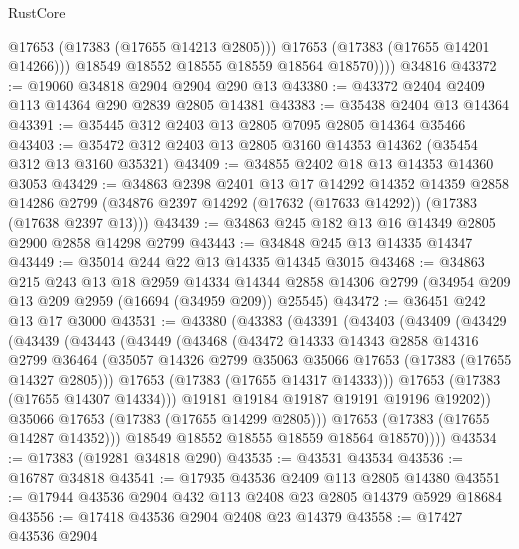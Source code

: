 \begin{lexlean}{RustCore}
\begin{coremodule}
                @17653
                (@17383 (@17655 @14213 @2805)))
              @17653
              (@17383 (@17655 @14201 @14266)))
            @18549
            @18552
            @18555
            @18559
            @18564
            @18570))))
    @34816
@43372 := @19060 @34818 @2904 @2904 @290 @13
@43380 := @43372 @2404 @2409 @113 @14364 @290 @2839 @2805 @14381
@43383 := @35438 @2404 @13 @14364
@43391 := @35445 @312 @2403 @13 @2805 @7095 @2805 @14364 @35466
@43403 := @35472 @312 @2403 @13 @2805 @3160 @14353 @14362 (@35454 @312 @13 @3160 @35321)
@43409 := @34855 @2402 @18 @13 @14353 @14360 @3053
@43429 := @34863
    @2398
    @2401
    @13
    @17
    @14292
    @14352
    @14359
    @2858
    @14286
    @2799
    (@34876 @2397 @14292 (@17632 (@17633 @14292)) (@17383 (@17638 @2397 @13)))
@43439 := @34863 @245 @182 @13 @16 @14349 @2805 @2900 @2858 @14298 @2799
@43443 := @34848 @245 @13 @14335 @14347
@43449 := @35014 @244 @22 @13 @14335 @14345 @3015
@43468 := @34863
    @215
    @243
    @13
    @18
    @2959
    @14334
    @14344
    @2858
    @14306
    @2799
    (@34954 @209 @13 @209 @2959 (@16694 (@34959 @209)) @25545)
@43472 := @36451 @242 @13 @17 @3000
@43531 := @43380
    (@43383
      (@43391
        (@43403
          (@43409
            (@43429
              (@43439
                (@43443
                  (@43449
                    (@43468
                      (@43472
                        @14333
                        @14343
                        @2858
                        @14316
                        @2799
                        @36464
                        (@35057 @14326 @2799 @35063 @35066 @17653 (@17383 (@17655 @14327 @2805)))
                        @17653
                        (@17383 (@17655 @14317 @14333)))
                      @17653
                      (@17383 (@17655 @14307 @14334)))
                    @19181
                    @19184
                    @19187
                    @19191
                    @19196
                    @19202))
                @35066
                @17653
                (@17383 (@17655 @14299 @2805)))
              @17653
              (@17383 (@17655 @14287 @14352)))
            @18549
            @18552
            @18555
            @18559
            @18564
            @18570))))
@43534 := @17383 (@19281 @34818 @290)
@43535 := @43531 @43534
@43536 := @16787 @34818
@43541 := @17935 @43536 @2409 @113 @2805 @14380
@43551 := @17944 @43536 @2904 @432 @113 @2408 @23 @2805 @14379 @5929 @18684
@43556 := @17418 @43536 @2904 @2408 @23 @14379
@43558 := @17427 @43536 @2904

\end{coremodule}
\end{lexlean}

